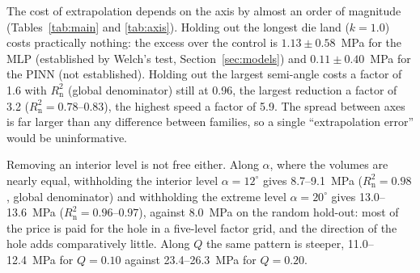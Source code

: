 \documentclass[subscriptcorrection,upint,varvw,barcolor=Goldenrod3,mathalfa=cal=euler,balance,hyphenate,french,pdf-a]{asmejour} %
\begin{document}
The cost of extrapolation depends on the axis by almost an order of magnitude (Tables~\ref{tab:main} and \ref{tab:axis}). Holding out the longest die land ($k=1.0$) costs practically nothing: the excess over the control is $1.13\pm0.58$~MPa for the MLP (established by Welch's test, Section~\ref{sec:models}) and $0.11\pm0.40$~MPa for the PINN (not established). %
Holding out the largest semi-angle costs a factor of 1.6 with $R^2_{\mathrm{n}}$ (global denominator) still at 0.96, the largest reduction a factor of 3.2 ($R^2_{\mathrm{n}}=0.78$--$0.83$), the highest speed a factor of 5.9. The spread between axes is far larger than any difference between families, so a single ``extrapolation error'' would be uninformative.

Removing an interior level is not free either. Along $\alpha$, where the volumes are nearly equal, withholding the interior level $\alpha=12^\circ$ gives 8.7--9.1~MPa ($R^2_{\mathrm{n}}=0.98$, global denominator) and withholding the extreme level $\alpha=20^\circ$ gives 13.0--13.6~MPa ($R^2_{\mathrm{n}}=0.96$--$0.97$), against 8.0~MPa on the random hold-out: most of the price is paid for the hole in a five-level factor grid, and the direction of the hole adds comparatively little. Along $Q$ the same pattern is steeper, 11.0--12.4~MPa for $Q=0.10$ against 23.4--26.3~MPa for $Q=0.20$.
\end{document}
